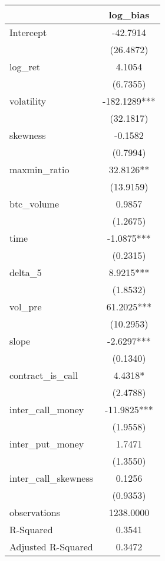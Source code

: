 \begin{tabular}{lc}
\hline
                      &  log\_bias    \\
\midrule
\midrule
Intercept             & -42.7914      \\
                      & (26.4872)     \\
log\_ret              & 4.1054        \\
                      & (6.7355)      \\
volatility            & -182.1289***  \\
                      & (32.1817)     \\
skewness              & -0.1582       \\
                      & (0.7994)      \\
maxmin\_ratio         & 32.8126**     \\
                      & (13.9159)     \\
btc\_volume           & 0.9857        \\
                      & (1.2675)      \\
time                  & -1.0875***    \\
                      & (0.2315)      \\
delta\_5              & 8.9215***     \\
                      & (1.8532)      \\
vol\_pre              & 61.2025***    \\
                      & (10.2953)     \\
slope                 & -2.6297***    \\
                      & (0.1340)      \\
contract\_is\_call    & 4.4318*       \\
                      & (2.4788)      \\
inter\_call\_money    & -11.9825***   \\
                      & (1.9558)      \\
inter\_put\_money     & 1.7471        \\
                      & (1.3550)      \\
inter\_call\_skewness & 0.1256        \\
                      & (0.9353)      \\
observations          & 1238.0000     \\
R-Squared             & 0.3541        \\
Adjusted R-Squared    & 0.3472        \\
\hline
\end{tabular}
